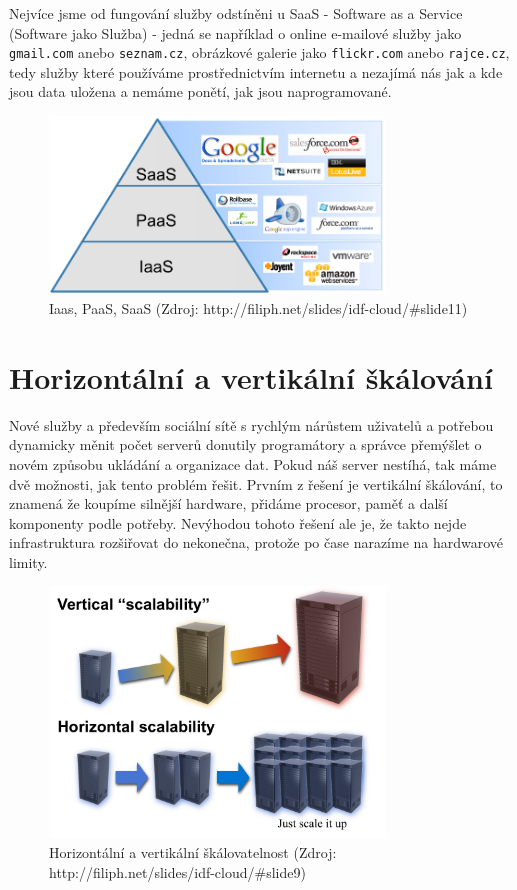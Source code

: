 Nejvíce jsme od fungování služby odstíněni u SaaS - Software as a Service (Software jako Služba) - jedná se například o online e-mailové služby jako \verb|gmail.com| anebo \verb|seznam.cz|, obrázkové galerie jako \verb|flickr.com| anebo \verb|rajce.cz|, tedy služby které používáme prostřednictvím internetu a nezajímá nás jak a kde jsou data uložena a nemáme ponětí, jak jsou naprogramované.

\begin{figure}[h]
\begin{center}
\includegraphics[width=3.5in]{figures/iaas-paas-saas.png}
\caption{Iaas, PaaS, SaaS (Zdroj: http://filiph.net/slides/idf-cloud/\#slide11)}
\label{fig:iaas-paas-saas}
\end{center}
\end{figure}

\section{Horizontální a vertikální škálování}
Nové služby a především sociální sítě s rychlým nárůstem uživatelů a potřebou dynamicky měnit počet serverů donutily programátory a správce přemýšlet o novém způsobu ukládání a organizace dat. Pokud náš server nestíhá, tak máme dvě možnosti, jak tento problém řešit. Prvním z řešení je vertikální škálování, to znamená že koupíme silnější hardware, přidáme procesor, paměť a další komponenty podle potřeby. Nevýhodou tohoto řešení ale je, že takto nejde infrastruktura rozšiřovat do nekonečna, protože po čase narazíme na hardwarové limity. 

\begin{figure}[h]
\begin{center}
\includegraphics[width=3.5in]{figures/horizontal-vertical-scalability.jpeg}
\caption{Horizontální a vertikální škálovatelnost 
(Zdroj: http://filiph.net/slides/idf-cloud/\#slide9)}
\label{fig:horizontal-vertical-scalability}
\end{center}
\end{figure}

